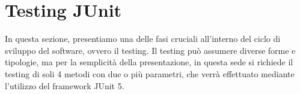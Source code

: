 \section{Testing JUnit}

 

\begin{flushleft}

    In questa sezione, presentiamo una delle fasi cruciali all'interno del ciclo di sviluppo del software, ovvero il testing. 
    Il testing può assumere diverse forme e tipologie, ma per la semplicità della presentazione, in questa sede si richiede
    il testing di soli 4 metodi con due o più parametri, che verrà effettuato mediante l'utilizzo del framework JUnit 5.
\end{flushleft}



